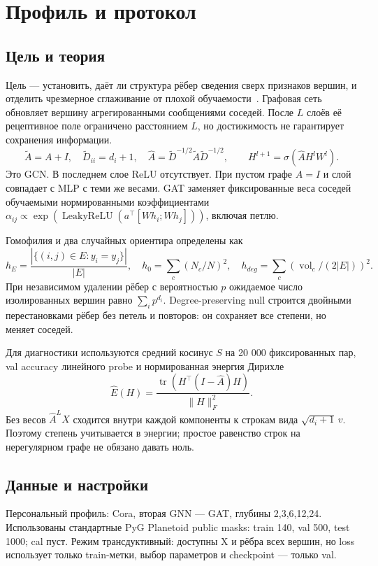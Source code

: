 \section{Профиль и протокол}
\subsection{Цель и теория}
Цель --- установить, даёт ли структура рёбер сведения сверх признаков вершин, и отделить чрезмерное сглаживание от плохой обучаемости~\cite{teacher}. Графовая сеть обновляет вершину агрегированными сообщениями соседей. После $L$ слоёв её рецептивное поле ограничено расстоянием $L$, но достижимость не гарантирует сохранения информации.
\begin{equation}\tilde A=A+I,\quad \tilde D_{ii}=d_i+1,\quad \hat A=\tilde D^{-1/2}\tilde A\tilde D^{-1/2},\qquad H^{l+1}=\sigma(\hat AH^lW^l).\end{equation}
Это GCN. В последнем слое ReLU отсутствует. При пустом графе $\hat A=I$ и слой совпадает с MLP с теми же весами. GAT заменяет фиксированные веса соседей обучаемыми нормированными коэффициентами $\alpha_{ij}\propto\exp(\operatorname{LeakyReLU}(a^\top[Wh_i;Wh_j]))$, включая петлю.

Гомофилия и два случайных ориентира определены как
\begin{equation}h_E=\frac{|\{(i,j)\in E:y_i=y_j\}|}{|E|},\quad h_0=\sum_c(N_c/N)^2,\quad h_{deg}=\sum_c(\operatorname{vol}_c/(2|E|))^2.\end{equation}
При независимом удалении рёбер с вероятностью $p$ ожидаемое число изолированных вершин равно $\sum_i p^{d_i}$. Degree-preserving null строится двойными перестановками рёбер без петель и повторов: он сохраняет все степени, но меняет соседей.

Для диагностики используются средний косинус $S$ на 20 000 фиксированных пар, val accuracy линейного probe и нормированная энергия Дирихле
\begin{equation}\hat E(H)=\frac{\operatorname{tr}(H^\top(I-\hat A)H)}{\|H\|_F^2}.\end{equation}
Без весов $\hat A^LX$ сходится внутри каждой компоненты к строкам вида $\sqrt{d_i+1}\,v$. Поэтому степень учитывается в энергии; простое равенство строк на нерегулярном графе не обязано давать ноль.

\subsection{Данные и настройки}
Персональный профиль: Cora, вторая GNN --- GAT, глубины 2,3,6,12,24. Использованы стандартные PyG Planetoid public masks: train 140, val 500, test 1000; cal пуст. Режим трансдуктивный: доступны X и рёбра всех вершин, но loss использует только train-метки, выбор параметров и checkpoint --- только val.

